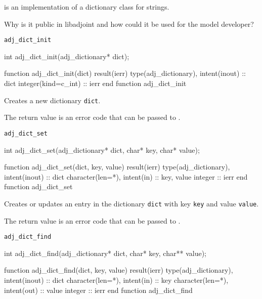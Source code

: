 
 is an implementation of a dictionary class for strings.

Why is it public in libadjoint and how could it be used for the model developer?

\begin{boxwithtitle}{\texttt{adj_dict_init}}
\begin{minipage}{\columnwidth}
\begin{ccode}
  int adj_dict_init(adj_dictionary* dict);
\end{ccode}
\begin{fortrancode}
  function adj_dict_init(dict) result(ierr)
    type(adj_dictionary), intent(inout) :: dict
    integer(kind=c_int) :: ierr
  end function adj_dict_init
\end{fortrancode}
\end{minipage}
\end{boxwithtitle}
Creates a new dictionary \texttt{dict}.

The return value is an error code that can be passed to .

\begin{boxwithtitle}{\texttt{adj_dict_set}}
\begin{minipage}{\columnwidth}
\begin{ccode}
  int adj_dict_set(adj_dictionary* dict, char* key, char* value);
\end{ccode}
\begin{fortrancode}
  function adj_dict_set(dict, key, value) result(ierr)
    type(adj_dictionary), intent(inout) :: dict
    character(len=*), intent(in) :: key, value
    integer :: ierr
  end function adj_dict_set
\end{fortrancode}
\end{minipage}
\end{boxwithtitle}

Creates or updates an entry in the dictionary \texttt{dict} with key \texttt{key} and value \texttt{value}.

The return value is an error code that can be passed to .

\begin{boxwithtitle}{\texttt{adj_dict_find}}
\begin{minipage}{\columnwidth}
\begin{ccode}
  int adj_dict_find(adj_dictionary* dict, char* key, char** value);
\end{ccode}
\begin{fortrancode}
  function adj_dict_find(dict, key, value) result(ierr)
    type(adj_dictionary), intent(inout) :: dict
    character(len=*), intent(in) :: key
    character(len=*), intent(out) :: value
    integer :: ierr
  end function adj_dict_find
\end{fortrancode}
\end{minipage}
\end{boxwithtitle}

